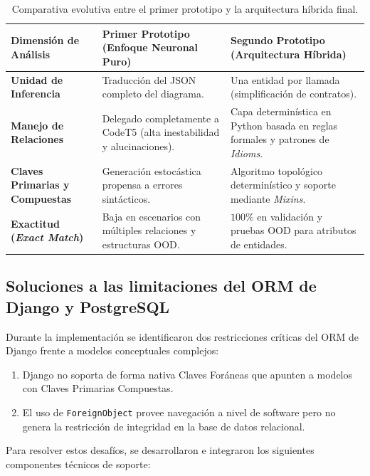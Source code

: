 \begin{table}[htbp]
    \centering
    \small
    \begin{tabular}{|p{3.5cm}|p{5.2cm}|p{5.2cm}|}
        \hline
        \textbf{Dimensión de Análisis} & \textbf{Primer Prototipo (Enfoque Neuronal Puro)} & \textbf{Segundo Prototipo (Arquitectura Híbrida)} \\
        \hline
        \textbf{Unidad de Inferencia} & Traducción del JSON completo del diagrama. & Una entidad por llamada (simplificación de contratos). \\
        \hline
        \textbf{Manejo de Relaciones} & Delegado completamente a CodeT5 (alta inestabilidad y alucinaciones). & Capa determinística en Python basada en reglas formales y patrones de \textit{Idioms}. \\
        \hline
        \textbf{Claves Primarias y Compuestas} & Generación estocástica propensa a errores sintácticos. & Algoritmo topológico determinístico y soporte mediante \textit{Mixins}. \\
        \hline
        \textbf{Exactitud (\textit{Exact Match})} & Baja en escenarios con múltiples relaciones y estructuras OOD. & $100\%$ en validación y pruebas OOD para atributos de entidades. \\
        \hline
    \end{tabular}
    \caption{Comparativa evolutiva entre el primer prototipo y la arquitectura híbrida final.}
    \label{tab:comparativa-prototipos}
\end{table}

\subsection{Soluciones a las limitaciones del ORM de Django y PostgreSQL}
\label{subsec:p2-limitaciones-django}

Durante la implementación se identificaron dos restricciones críticas del ORM de Django frente a modelos conceptuales complejos:
\begin{enumerate}
    \item Django no soporta de forma nativa Claves Foráneas que apunten a modelos con Claves Primarias Compuestas.
    \item El uso de \texttt{ForeignObject} provee navegación a nivel de software pero no genera la restricción de integridad en la base de datos relacional.
\end{enumerate}

Para resolver estos desafíos, se desarrollaron e integraron los siguientes componentes técnicos de soporte:

